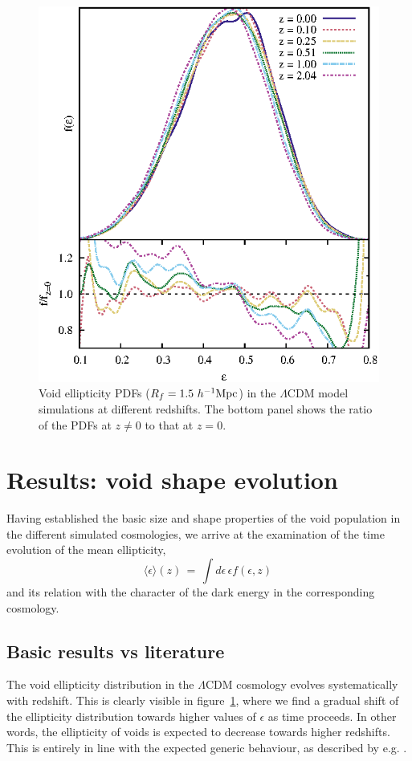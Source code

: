 \begin{figure}
	\includegraphics[width=\textwidth]{ch_voidsde/img/ell_WMAPevol}
	\caption{Void ellipticity PDFs ($R_f = 1.5 ~h^{-1} {\rm Mpc}$) in the $\Lambda$CDM model simulations at different redshifts. The bottom panel shows 
the ratio of the PDFs at $z\neq0$ to that at $z=0$.}
	\label{fig:ell_WMAPevol}
\end{figure}

\section{Results: void shape evolution}
\label{sec:shapeVSz}
Having established the basic size and shape properties of the void population in the different simulated 
cosmologies, we arrive at the examination of the time evolution of the mean ellipticity, 
\begin{equation}
\langle \epsilon \rangle(z)\,=\,\int d\epsilon \, \epsilon f(\epsilon,z)\,
\end{equation}
and its relation with the character of the dark energy in the corresponding cosmology. 

\subsection{Basic results vs literature}
\label{sec:bosVSliterature}
The void ellipticity distribution in the $\Lambda$CDM cosmology evolves systematically with redshift. This is 
clearly visible in figure~\ref{fig:ell_WMAPevol}, where we find a gradual shift of the ellipticity distribution 
towards higher values of $\epsilon$ as time proceeds. In other words, the ellipticity of voids is expected 
to decrease towards higher redshifts. This is entirely in line with the expected generic behaviour, as described by 
e.g. \citet{leepark09}. 


